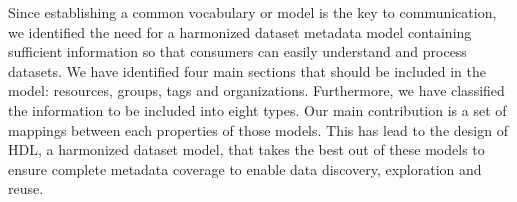 Since establishing a common vocabulary or model is the key to communication, we identified the need for a harmonized dataset metadata model containing sufficient information so that consumers can easily understand and process datasets. We have identified four main sections that should be included in the model: resources, groups, tags and organizations. Furthermore, we have classified the information to be included into eight types. Our main contribution is a set of mappings between each properties of those models. This has lead to the design of HDL, a harmonized dataset model, that takes the best out of these models to ensure complete metadata coverage to enable data discovery, exploration and reuse.